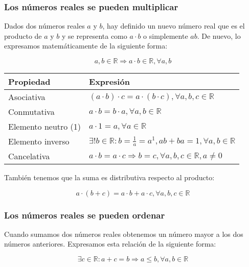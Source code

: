 \subsubsection{Los números reales se pueden multiplicar}

Dados dos números reales $a$ y $b$, hay definido un nuevo número real que es el producto de $a$ y $b$ y se representa como $a \cdot b$ o simplemente $ab$.
De nuevo, lo expresamos matemáticamente de la siguiente forma:

\[a,b \in\mathbb{R} \Rightarrow a \cdot b \in\mathbb{R}, \forall a,b\]

\begin{center}
\begin{tabular}{l l}
	\textbf{Propiedad}  & \textbf{Expresión}                                                                            \\
	\toprule
	Asociativa          & $(a \cdot b) \cdot c = a \cdot (b \cdot c), \forall a,b,c \in\mathbb{R}$                      \\
	Conmutativa         & $a \cdot b = b \cdot a, \forall a,b \in\mathbb{R}$                                            \\
	Elemento neutro (1) & $a \cdot 1 = a, \forall a \in\mathbb{R}$                                                      \\
	Elemento inverso    & $\exists! b \in\mathbb{R} : b = \frac{1}{a} = a^{1}, ab + ba = 1, \forall a, b \in\mathbb{R}$ \\
	Cancelativa         & $a \cdot b = a \cdot c \Rightarrow b=c, \forall a,b,c \in\mathbb{R}, a \neq 0$                \\
\end{tabular}
\end{center}

También tenemos que la suma es distributiva respecto al producto:

\[a \cdot (b+c) = a \cdot b + a \cdot c, \forall a,b,c \in\mathbb{R}\]

\subsubsection{Los números reales se pueden ordenar}

Cuando sumamos dos números reales obtenemos un número mayor a los dos números anteriores.
Expresamos esta relación de la siguiente forma:

\[\exists c \in\mathbb{R} : a+c = b \Rightarrow a \leq b, \forall a,b \in\mathbb{R}\]

